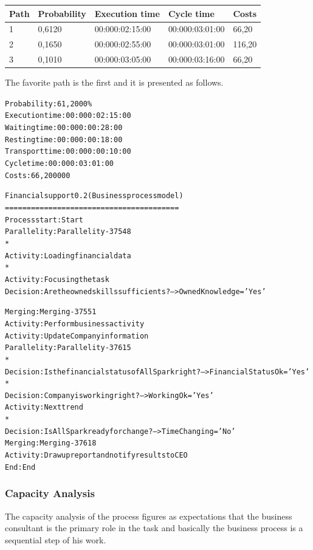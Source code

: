 \begin{table}
\centering
\begin{tabular}{|l|l|l|l|l|}
Path&Probability&Execution time&Cycle time&Costs\\
\hline
1&0,6120&00:000:02:15:00&00:000:03:01:00&66,20\\
\hline
2&0,1650&00:000:02:55:00&00:000:03:01:00&116,20\\
\hline
3&0,1010&00:000:03:05:00&00:000:03:16:00&66,20
\end{tabular}
\end{table}

The favorite path is the first and it is presented as follows.\\

\begin{alltt}
Probability:   61,2000\%
Execution time:  00:000:02:15:00
Waiting time:  00:000:00:28:00
Resting time:  00:000:00:18:00
Transport time:  00:000:00:10:00
Cycle time:  00:000:03:01:00
Costs:  66,200000

Financial support 0.2 (Business process model)
========================================
Process start: Start
Parallelity: Parallelity-37548
    *
    Activity: Loading financial data
    *
    Activity: Focusing the task
    Decision: Are the owned skills sufficients? --> OwnedKnowledge='Yes'

Merging: Merging-37551
Activity: Perform business activity
Activity: Update Company information
Parallelity: Parallelity-37615
    *
    Decision: Is the financial status of AllSpark right? --> FinancialStatusOk='Yes'
    *
    Decision: Company is working right? --> WorkingOk='Yes'
    Activity: Next trend
    *
    Decision: Is AllSpark ready for change? --> TimeChanging='No'
Merging: Merging-37618
Activity: Draw up report and notify results to CEO
End: End
\end{alltt}


\subsubsection{Capacity Analysis}
The capacity analysis of the process figures as expectations that the business consultant is the primary role in the task and basically the business process is a sequential step of his work.

